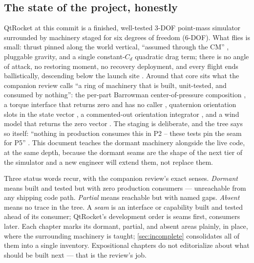 \subsection{The state of the project, honestly}\label{sec:intro-state}

QtRocket at this commit is a finished, well-tested 3-DOF point-mass simulator surrounded by
machinery staged for six degrees of freedom (6-DOF). What flies is small: thrust pinned
along the world vertical, ``assumed through the CM'' ,
pluggable gravity, and a single constant-$C_d$ quadratic drag term; there is no angle of
attack, no restoring moment, no recovery deployment, and every flight ends ballistically,
descending below the launch site . Around that core sits what
the companion review calls ``a ring of machinery that is built, unit-tested, and consumed by
nothing'': the per-part Barrowman center-of-pressure composition
, a torque interface that returns zero and has no caller
, quaternion orientation slots in the state vector
, a commented-out orientation integrator ,
and a wind model that returns the zero vector . The staging is
deliberate, and the tree says so itself: ``nothing in production consumes this in P2 --
these tests pin the seam for P5'' . This document teaches
the dormant machinery alongside the live code, at the same depth, because the dormant seams
are the shape of the next tier of the simulator and a new engineer will extend them, not
replace them.

\begin{keyinsight}
Three status words recur, with the companion review's exact senses. \emph{Dormant} means
built and tested but with zero production consumers --- unreachable from any shipping code
path. \emph{Partial} means reachable but with named gaps. \emph{Absent} means no trace in
the tree. A \emph{seam} is an interface or capability built and tested ahead of its
consumer; QtRocket's development order is seams first, consumers later. Each chapter marks
its dormant, partial, and absent areas plainly, in place, where the surrounding machinery is
taught; \cref{sec:incomplete} consolidates all of them into a single inventory. Expositional
chapters do not editorialize about what should be built next --- that is the review's job.
\end{keyinsight}

